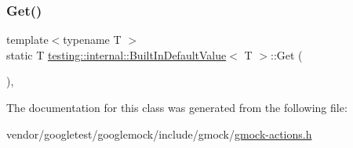 \mbox{\label{classtesting_1_1internal_1_1_built_in_default_value_a7e26c1df14a887c8f393b29d6ea162e6}} 
\subsubsection{\texorpdfstring{Get()}{Get()}}
{\footnotesize\ttfamily template$<$typename T $>$ \\
static T \hyperlink{classtesting_1_1internal_1_1_built_in_default_value}{testing\+::internal\+::\+Built\+In\+Default\+Value}$<$ T $>$\+::Get (\begin{DoxyParamCaption}{ }\end{DoxyParamCaption})\hspace{0.3cm}{\ttfamily [inline]}, {\ttfamily [static]}}



The documentation for this class was generated from the following file\+:\begin{DoxyCompactItemize}
\item 
vendor/googletest/googlemock/include/gmock/\hyperlink{gmock-actions_8h}{gmock-\/actions.\+h}\end{DoxyCompactItemize}
